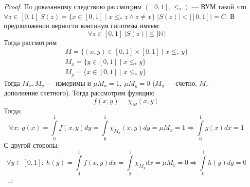 \begin{proof}
	По доказанному следствию рассмотрим $([0,1], \leq_*)$ --- ВУМ такой что $\forall z \in [0,1] \ S(z) = \{x \in [0,1] \mid x \leq_* z \wedge z \neq x\}$ $|S(z)| < |[0,1]| = C$. В предположении верности континум гипотезы имеем:
	$$
	\forall z \in [0,1] \ |S(z)| \leq |\mathbb{N}|
	$$
	Тогда рассмотрим 
	\begin{gather*}
		M = \{(x,y) \in [0,1] \times [0,1] \mid x \leq_* y \} \\
		M_x = \{y \in [0,1] \mid x \leq_* y \}  \\
		M_y = \{x \in [0,1] \mid x \leq_* y \}
	\end{gather*}
	Тогда $M_x, M_y$ --- измеримы и $\mu M_x = 1, \ \mu M_y  =  0$ ($M_y$ --- счетно, $M_x$ --- дополнение счетного). Тогда рассмотрим функцию $$f(x,y) = \chi_M(x,y)$$ Тогда:
	$$
	\forall x : \ g(x) = \int\limits_{0}^1 f(x,y)dy = \int\limits_{0}^1 \chi_{M_x}(x,y)dy = \mu M_x = 1 \Rightarrow \int\limits_{0}^1 g(x) dx = 1
	$$
	С другой стороны: 
	$$
	\forall y \in [0,1]: \ h(y) = \int\limits_{0}^1 f(x,y)dx = \int\limits_{0}^1 \chi_{M_y} dx = \mu M_y = 0 \Rightarrow \int\limits_{0}^1h(y)dy = 0
	$$
\end{proof}